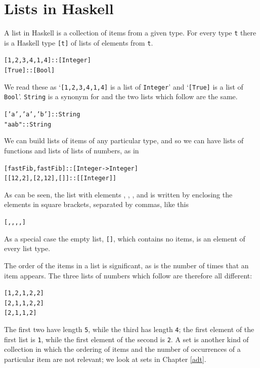 \section{Lists in Haskell}

A list in Haskell is a collection of items from a given type. For every type \texttt{t}
there is a Haskell type \texttt{[t]} of lists of elements from \texttt{t}.
\begin{alltt}
[1,2,3,4,1,4] :: [Integer]
[True]        :: [Bool]
\end{alltt}
We read these as `\texttt{[1,2,3,4,1,4]} is a list of \texttt{Integer}' and
`\texttt{[True]} is a list of \texttt{Bool}'. \texttt{String} is a synonym
for {\mi
[Char]} and the two lists which follow are the same.
\begin{alltt}
['a','a','b'] :: String
"aab"         :: String
\end{alltt}
We can build lists of items of any particular type, and so we can have lists of
functions and lists of lists of numbers, as in
\begin{alltt}
[fastFib,fastFib]  :: [ Integer -> Integer ]
[[12,2],[2,12],[]] :: [ [Integer] ]
\end{alltt}
As can be seen, the list with elements \texttt{\eone}, \texttt{\etwo}, \texttt{}, \texttt{} and \texttt{}  is written by enclosing the elements in square brackets, separated by commas, like this
\begin{alltt}
[\texttt{\eone},\texttt{\etwo},\texttt{},\texttt{},\texttt{}]
\end{alltt}
As a special case the empty list, \texttt{[]},\minx{[]} which contains no items, is
an element of every list type.

The order of the
items in a list is significant, as is the number of times that an item
appears. The three lists of numbers which follow are therefore all
different:
\begin{alltt}
[1,2,1,2,2]
[2,1,1,2,2]
[2,1,1,2]
\end{alltt}
The first two have length \texttt{5}, while the third has length
\texttt{4}; the first element of the first list is \texttt{1}, while
the first element of the second is \texttt{2}. A set is another kind of
collection in which the ordering of items and the number of 
occurrences of a particular item are not relevant; we look at sets in Chapter \ref{adt}.

